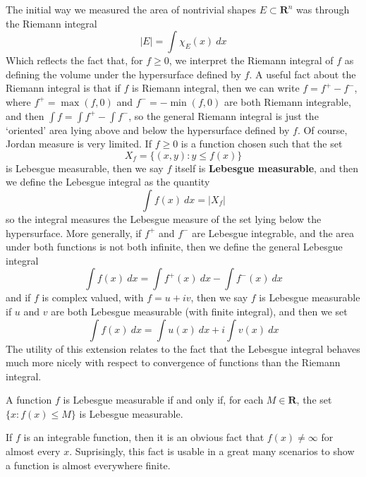 The initial way we measured the area of nontrivial shapes $E \subset \mathbf{R}^n$ was through the Riemann integral
%
\[ |E| = \int \chi_E(x)\ dx \]
%
Which reflects the fact that, for $f \geq 0$, we interpret the Riemann integral of $f$ as defining the volume under the hypersurface defined by $f$. A useful fact about the Riemann integral is that if $f$ is Riemann integral, then we can write $f = f^+ - f^-$, where $f^+ = \max(f,0)$ and $f^- = -\min(f,0)$ are both Riemann integrable, and then $\int f = \int f^+ - \int f^-$, so the general Riemann integral is just the `oriented' area lying above and below the hypersurface defined by $f$. Of course, Jordan measure is very limited. If $f \geq 0$ is a function chosen such that the set
%
\[ X_f =  \{ (x,y): y \leq f(x) \} \]
%
is Lebesgue measurable, then we say $f$ itself is {\bf Lebesgue measurable}, and then we define the Lebesgue integral as the quantity
%
\[ \int f(x)\ dx = |X_f| \]
%
so the integral measures the Lebesgue measure of the set lying below the hypersurface. More generally, if $f^+$ and $f^-$ are Lebesgue integrable, and the area under both functions is not both infinite, then we define the general Lebesgue integral
%
\[ \int f(x)\ dx = \int f^+(x)\ dx - \int f^-(x)\ dx \]
%
and if $f$ is complex valued, with $f = u + iv$, then we say $f$ is Lebesgue measurable if $u$ and $v$ are both Lebesgue measurable (with finite integral), and then we set
%
\[ \int f(x)\ dx = \int u(x)\ dx + i \int v(x)\ dx \]
%
The utility of this extension relates to the fact that the Lebesgue integral behaves much more nicely with respect to convergence of functions than the Riemann integral.

\begin{theorem}
  A function $f$ is Lebesgue measurable if and only if, for each $M \in \mathbf{R}$, the set $\{ x: f(x) \leq M \}$ is Lebesgue measurable.
\end{theorem}

If $f$ is an integrable function, then it is an obvious fact that $f(x) \neq \infty$ for almost every $x$. Suprisingly, this fact is usable in a great many scenarios to show a function is almost everywhere finite.


